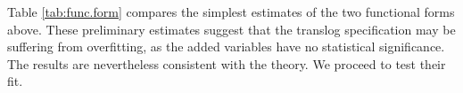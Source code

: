 \documentclass[12pt,a4paper]{article}\usepackage[]{graphicx}\usepackage[]{color}
\begin{document}

Table \ref{tab:func.form} compares the simplest estimates of the two functional forms above. These preliminary estimates suggest that the translog specification may be suffering from overfitting, as the added variables have no statistical significance. The results are nevertheless consistent with the theory. We proceed to test their fit.
\end{document}
